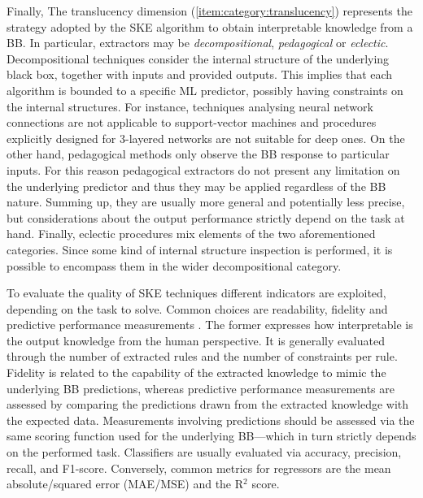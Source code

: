 \documentclass[
]{ceurart}
\begin{document}
Finally, The translucency dimension \cite{andrews1995survey} (\cref{item:category:translucency}) represents the strategy adopted by the SKE algorithm to obtain interpretable knowledge from a BB.
%
In particular, extractors may be \emph{decompositional}, \emph{pedagogical} or \emph{eclectic}.
%
Decompositional techniques consider the internal structure of the underlying black box, together with inputs and provided outputs.
%
This implies that each algorithm is bounded to a specific ML predictor, possibly having constraints on the internal structures.
%
For instance, techniques analysing neural network connections are not applicable to support-vector machines and procedures explicitly designed for 3-layered networks are not suitable for deep ones.
%
On the other hand, pedagogical methods only observe the BB response to particular inputs.
%
For this reason pedagogical extractors do not present any limitation on the underlying predictor and thus they may be applied regardless of the BB nature.
%
Summing up, they are usually more general and potentially less precise, but considerations about the output performance strictly depend on the task at hand.
%
Finally, eclectic procedures mix elements of the two aforementioned categories.
%
Since some kind of internal structure inspection is performed, it is possible to encompass them in the wider decompositional category.

To evaluate the quality of SKE techniques different indicators are exploited, depending on the task to solve.
%
Common choices are readability, fidelity and predictive performance measurements \cite{towell1993extracting}.
%
The former expresses how interpretable is the output knowledge from the human perspective.
%
It is generally evaluated through the number of extracted rules and the number of constraints per rule.
%
Fidelity is related to the capability of the extracted knowledge to mimic the underlying BB predictions, whereas predictive performance measurements are assessed by comparing the predictions drawn from the extracted knowledge with the expected data.
%
Measurements involving predictions should be assessed via the same scoring function used for the underlying BB---which in turn strictly depends on the performed task.
%
Classifiers are usually evaluated via accuracy, precision, recall, and F1-score.
%
Conversely, common metrics for regressors are the mean absolute/squared error (MAE/MSE) and the R${^2}$ score.
\end{document}
